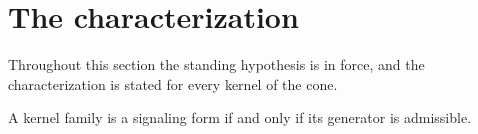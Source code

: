 \section{The characterization}\label{sec:characterization}

Throughout this section the standing hypothesis is in force, and the characterization
is stated for every kernel of the cone.

\begin{theorem}\label{thm:characterization}
  A kernel family is a signaling form if and only if its generator is admissible.
\end{theorem}
